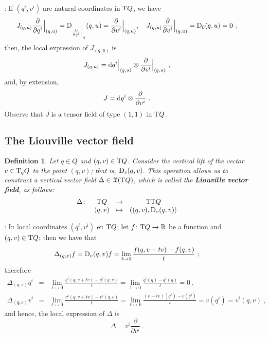 \documentclass[12pt]{report}
\newtheorem{definition}[teor]{Definition}
\def\derpar#1#2{\frac{\partial{#1}}{\partial{#2}}}
\def\vf{\mathfrak X}
\def\d{{\rm d}}
\def\Real{\mathbb{R}}
\def\Tan{{\rm T}}
\begin{document}
:
If $(q^i,v^i)$ are natural coordinates in $\Tan Q$, we have
$$
J_{(q,u)}\derpar{}{q^i}\Big\vert_{(q,u)}=
{\rm D}_{\derpar{}{q^i}\Big\vert_q}(q,u)=\derpar{}{v^i}\Big\vert_{(q,u)}
,\quad
J_{(q,u)}\derpar{}{v^i}\Big\vert_{(q,u)}={\rm D}_0(q,u)=0 \ ;
$$
then, the local expression of $J_{(q,u)}$ is
$$
J_{(q,u)}=\d q^i\Big\vert_{(q,u)}\otimes\derpar{}{v^i}\Big\vert_{(q,u)} \ ,
$$
and, by extension,
$$
J=\d q^i\otimes\derpar{}{v^i} \ .
$$
Observe that $J$ is a tensor field of type $(1,1)$ in $\Tan Q$.


\subsection{The Liouville vector field}


\begin{definition}
Let $q\in Q$ and $(q,v)\in\Tan Q$.
Consider the vertical lift of  the vector $v\in \Tan_qQ$
to the point $(q,v)$; that is, ${\rm D}_v(q,v)$.
This operation allows us to construct a vertical vector field
$\Delta \in \vf(\Tan Q)$, which is called the \textbf{Liouville vector field},
as follows:
$$
\begin{array}{cccc}
\Delta \colon & \Tan Q & \to & \Tan\Tan Q
\\
& (q,v) & \mapsto & ((q,v),{\rm D}_v(q,v))
\end{array}
$$
\end{definition}

:
In local coordinates $(q^i,v^i)$ en $\Tan Q$;  
let $f\colon\Tan Q \to \Real$ be a function and $(q,v)\in\Tan Q$; 
then we have that
$$
\Delta_{(q,v)}f={\rm D}_v(q,v)f=
\lim_{t \mapsto 0}\frac{f(q,v+tv)-f(q,v)}{t} \ ;
$$
therefore
\begin{eqnarray*}
\Delta_{(q,v)}q^i &=&
\lim_{t \mapsto 0}\frac{q^i(q,v+tv)-q^i(q,v)}{t}
=\lim_{t \mapsto 0}\frac{q^i(q)-q^i(q)}{t}=0 \ ,
\\
\Delta_{(q,v)}v^i&=&
\lim_{t \mapsto 0}\frac{v^i(q,v+tv)-v^i(q,v)}{t}
=\lim_{t \mapsto 0}\frac{(v+tv)(q^i)-v(q^i)}{t}=v(q^i)=v^i(q,v) \ ,
\end{eqnarray*}
and hence, the local expression of $\Delta$ is
$$
\Delta=v^i\derpar{}{v^i} \ .
$$
\end{document}
